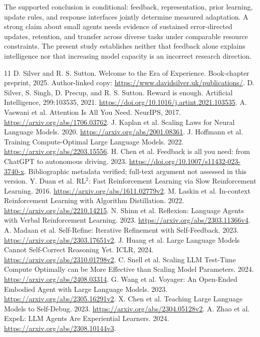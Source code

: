 \documentclass[11pt]{article}
\begin{document}
The supported conclusion is conditional: feedback, representation, prior
learning, update rules, and response interfaces jointly determine measured
adaptation. A strong claim about small agents needs evidence of sustained
error-directed updates, retention, and transfer across diverse tasks under
comparable resource constraints. The present study establishes neither that
feedback alone explains intelligence nor that increasing model capacity is an
incorrect research direction.

\begin{thebibliography}{11}
 D. Silver and R. S. Sutton. Welcome to the Era of Experience.
Book-chapter preprint, 2025. Author-linked copy:
\url{https://www.davidsilver.uk/publications/}.
 D. Silver, S. Singh, D. Precup, and R. S. Sutton.
Reward is enough. Artificial Intelligence, 299:103535, 2021.
\url{https://doi.org/10.1016/j.artint.2021.103535}.
 A. Vaswani et al. Attention Is All You Need. NeurIPS, 2017.
\url{https://arxiv.org/abs/1706.03762}.
 J. Kaplan et al. Scaling Laws for Neural Language Models. 2020.
\url{https://arxiv.org/abs/2001.08361}.
 J. Hoffmann et al. Training Compute-Optimal Large Language Models. 2022.
\url{https://arxiv.org/abs/2203.15556}.
 H. Chen et al. Feedback is all you need: from ChatGPT to autonomous driving. 2023.
\url{https://doi.org/10.1007/s11432-023-3740-x}. Bibliographic metadata verified;
full-text argument not assessed in this version.
 Y. Duan et al. RL$^2$: Fast Reinforcement Learning via Slow Reinforcement Learning. 2016.
\url{https://arxiv.org/abs/1611.02779v2}.
 M. Laskin et al. In-context Reinforcement Learning with Algorithm Distillation. 2022.
\url{https://arxiv.org/abs/2210.14215}.
 N. Shinn et al. Reflexion: Language Agents with Verbal Reinforcement Learning. 2023.
\url{https://arxiv.org/abs/2303.11366v4}.
 A. Madaan et al. Self-Refine: Iterative Refinement with Self-Feedback. 2023.
\url{https://arxiv.org/abs/2303.17651v2}.
 J. Huang et al. Large Language Models Cannot Self-Correct Reasoning Yet. ICLR, 2024.
\url{https://arxiv.org/abs/2310.01798v2}.
 C. Snell et al. Scaling LLM Test-Time Compute Optimally can be More Effective than Scaling Model Parameters. 2024.
\url{https://arxiv.org/abs/2408.03314}.
 G. Wang et al. Voyager: An Open-Ended Embodied Agent with Large Language Models. 2023.
\url{https://arxiv.org/abs/2305.16291v2}.
 X. Chen et al. Teaching Large Language Models to Self-Debug. 2023.
\url{https://arxiv.org/abs/2304.05128v2}.
 A. Zhao et al. ExpeL: LLM Agents Are Experiential Learners. 2024.
\url{https://arxiv.org/abs/2308.10144v3}.
\end{thebibliography}
\end{document}
